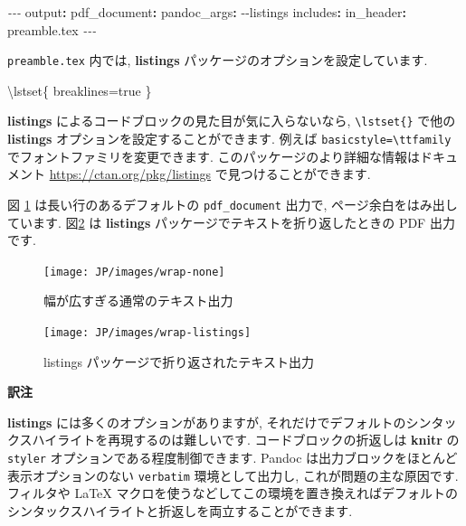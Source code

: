 \documentclass[
  11pt,
  lualatex,ja=standard,jafont=noto]{bxjsreport}
\newenvironment{Shaded}{\begin{snugshade}}{\end{snugshade}}
\newcommand{\AttributeTok}[1]{\textcolor[rgb]{0.77,0.63,0.00}{#1}}
\newcommand{\FunctionTok}[1]{\textcolor[rgb]{0.00,0.00,0.00}{#1}}
\newcommand{\KeywordTok}[1]{\textcolor[rgb]{0.13,0.29,0.53}{\textbf{#1}}}
\newcommand{\NormalTok}[1]{#1}
\newcommand{\PreprocessorTok}[1]{\textcolor[rgb]{0.56,0.35,0.01}{\textit{#1}}}
\newenvironment{infobox}[1]{\begin{itemize}\renewcommand{\labelitemi}{\raisebox{-.7\height}[0pt][0pt]{%
  {\setkeys{Gin}{width=3em,keepaspectratio}\texttt{[image: \_latex/\_img/\#1]}}}}
  \setlength{\fboxsep}{1em}
  \begin{greyblock}
  \item
  }{\end{greyblock}\end{itemize}
}
\begin{document}
\begin{Shaded}
\begin{Highlighting}[]
\PreprocessorTok{{-}{-}{-}}
\FunctionTok{output}\KeywordTok{:}
\AttributeTok{  }\FunctionTok{pdf\_document}\KeywordTok{:}
\AttributeTok{    }\FunctionTok{pandoc\_args}\KeywordTok{:}\AttributeTok{ {-}{-}listings}
\AttributeTok{    }\FunctionTok{includes}\KeywordTok{:}
\AttributeTok{      }\FunctionTok{in\_header}\KeywordTok{:}\AttributeTok{ preamble.tex}
\PreprocessorTok{{-}{-}{-}}
\end{Highlighting}
\end{Shaded}

\texttt{preamble.tex} 内では, \textbf{listings} パッケージのオプションを設定しています.

\begin{Shaded}
\begin{Highlighting}[]
\FunctionTok{\textbackslash{}lstset}\NormalTok{\{}
\NormalTok{  breaklines=true}
\NormalTok{\}}
\end{Highlighting}
\end{Shaded}

\textbf{listings} によるコードブロックの見た目が気に入らないなら, \texttt{\textbackslash{}lstset\{\}} で他の \textbf{listings} オプションを設定することができます. 例えば \texttt{basicstyle=\textbackslash{}ttfamily} でフォントファミリを変更できます. このパッケージのより詳細な情報はドキュメント \url{https://ctan.org/pkg/listings} で見つけることができます.

図 \ref{fig:wrap-text-1} は長い行のあるデフォルトの \texttt{pdf\_document} 出力で, ページ余白をはみ出しています. 図\ref{fig:wrap-text-2} は \textbf{listings} パッケージでテキストを折り返したときの PDF 出力です.

\begin{figure}

{\centering \texttt{[image: JP/images/wrap-none]} 

}

\caption{幅が広すぎる通常のテキスト出力}\label{fig:wrap-text-1}
\end{figure}
\begin{figure}

{\centering \texttt{[image: JP/images/wrap-listings]} 

}

\caption{listings パッケージで折り返されたテキスト出力}\label{fig:wrap-text-2}
\end{figure}

\begin{infobox}{memo}
\textbf{訳注}

\textbf{listings} には多くのオプションがありますが, それだけでデフォルトのシンタックスハイライトを再現するのは難しいです. コードブロックの折返しは \textbf{knitr} の \texttt{styler} オプションである程度制御できます. Pandoc は出力ブロックをほとんど表示オプションのない \texttt{verbatim} 環境として出力し, これが問題の主な原因です. フィルタや LaTeX マクロを使うなどしてこの環境を置き換えればデフォルトのシンタックスハイライトと折返しを両立することができます.

\end{infobox}
\end{document}
